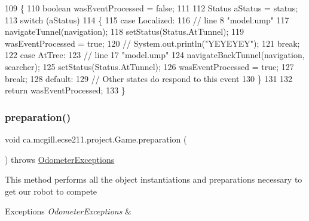 \begin{DoxyCode}
109   \{
110     \textcolor{keywordtype}{boolean} wasEventProcessed = \textcolor{keyword}{false};
111     
112     Status aStatus = status;
113     \textcolor{keywordflow}{switch} (aStatus)
114     \{
115       \textcolor{keywordflow}{case} Localized:
116         \textcolor{comment}{// line 8 "model.ump"}
117         navigateTunnel(navigation);
118         setStatus(Status.AtTunnel);
119         wasEventProcessed = \textcolor{keyword}{true};
120        \textcolor{comment}{// System.out.println("YEYEYEY");}
121         \textcolor{keywordflow}{break};
122       \textcolor{keywordflow}{case} AtTree:
123         \textcolor{comment}{// line 17 "model.ump"}
124         navigateBackTunnel(navigation, searcher);
125         setStatus(Status.AtTunnel);
126         wasEventProcessed = \textcolor{keyword}{true};
127         \textcolor{keywordflow}{break};
128       \textcolor{keywordflow}{default}:
129         \textcolor{comment}{// Other states do respond to this event}
130     \}
131 
132     \textcolor{keywordflow}{return} wasEventProcessed;
133   \}
\end{DoxyCode}
\mbox{\label{enumca_1_1mcgill_1_1ecse211_1_1project_1_1_game_a8f3c5b18f98ee56f5f03afd72fa40bcb}} 
\subsubsection{\texorpdfstring{preparation()}{preparation()}}
{\footnotesize\ttfamily void ca.\+mcgill.\+ecse211.\+project.\+Game.\+preparation (\begin{DoxyParamCaption}{ }\end{DoxyParamCaption}) throws \hyperlink{classca_1_1mcgill_1_1ecse211_1_1odometer_1_1_odometer_exceptions}{Odometer\+Exceptions}}

This method performs all the object instantiations and preparations necessary to get our robot to compete


\begin{DoxyExceptions}{Exceptions}
{\em Odometer\+Exceptions} & \\
\hline
\end{DoxyExceptions}


